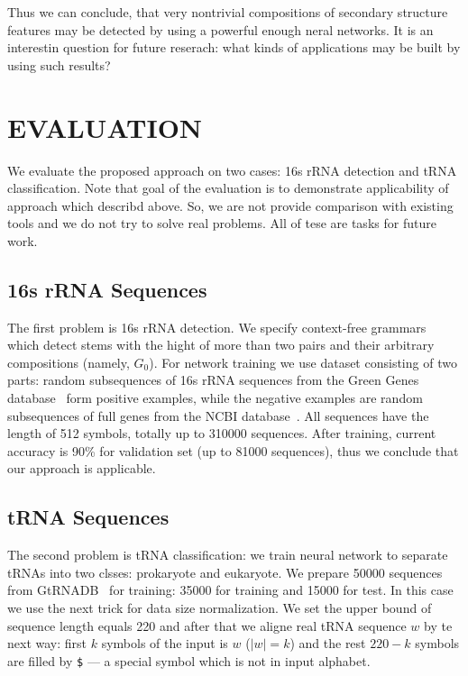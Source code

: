 \documentclass[a4paper,twoside]{article}
\begin{document}
Thus we can conclude, that very nontrivial compositions of secondary structure features may be detected by using a powerful enough neral networks.
It is an interestin question for future reserach: what kinds of applications may be built by using such results?


\section{\uppercase{Evaluation}}
\label{sec:evaluation}

\noindent We evaluate the proposed approach on two cases: 16s rRNA detection and tRNA classification.
Note that goal of the evaluation is to demonstrate applicability of approach which describd above.
So, we are not provide comparison with existing tools and we do not try to solve real problems.
All of tese are tasks for future work.

\subsection{16s rRNA Sequences}
\noindent The first problem is 16s rRNA detection.
We specify context-free grammars which detect stems with the hight of more than two pairs and their arbitrary compositions (namely, $G_0$).
For network training we use dataset consisting of two parts: random subsequences of 16s rRNA sequences from the Green Genes database~\cite{pmid16820507} form positive examples, while the negative examples are random subsequences of full genes from the NCBI database~\cite{pmid19854944}.
All sequences have the length of 512 symbols, totally up to 310000 sequences.
After training, current accuracy is 90\% for validation set (up to 81000 sequences), thus we conclude that our approach is applicable.

\subsection{tRNA Sequences}

\noindent The second problem is tRNA classification: we train neural network to separate tRNAs into two clsses: prokaryote and eukaryote.
We prepare 50000 sequences from GtRNADB~\cite{Chan2009} for training: 35000 for training and 15000 for test.
In this case we use the next trick for data size normalization.
We set the upper bound of sequence length equals 220 and after that we aligne real tRNA sequence $w$ by te next way: first $k$ symbols of the input is $w$ ($|w|=k$) and the rest $220-k$ symbols are filled by \verb|$| --- a special symbol which is not in input alphabet.
\end{document}
